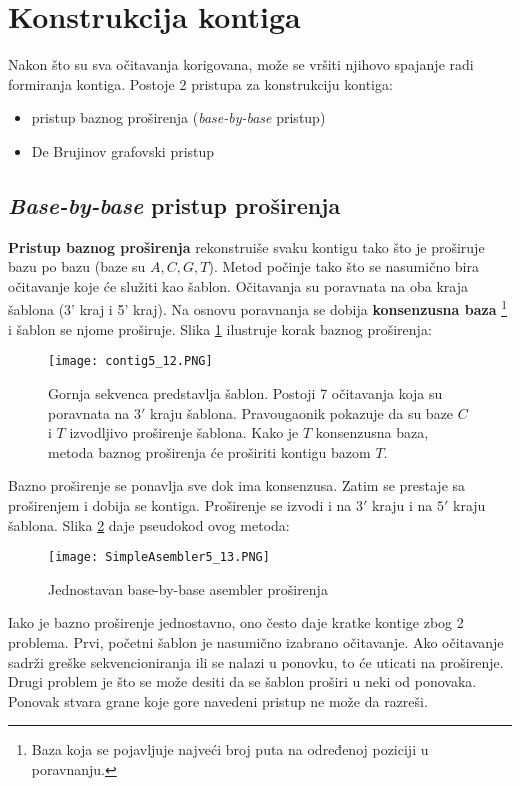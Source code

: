\documentclass[12pt,oneside]{memoir}
\begin{document}
\section{Konstrukcija kontiga}

Nakon što su sva očitavanja korigovana, može se vršiti njihovo spajanje radi formiranja kontiga. Postoje 2 pristupa za konstrukciju kontiga:
\begin{itemize}
    \item{pristup baznog proširenja (\textit{base-by-base} pristup)}
    \item{De Brujinov grafovski pristup}
\end{itemize}

\subsection{\textit{Base-by-base} pristup proširenja}

\textbf{Pristup baznog proširenja} rekonstruiše svaku kontigu tako što je proširuje bazu po bazu (baze su $A, C, G, T$). Metod počinje tako što se nasumično bira očitavanje koje će služiti kao šablon. Očitavanja su poravnata na oba kraja šablona (3' kraj i 5' kraj). Na osnovu poravnanja se dobija \textbf{konsenzusna baza} \footnote{Baza koja se pojavljuje najveći broj puta na određenoj poziciji u poravnanju.} i šablon se njome proširuje. Slika \ref{fig:7} ilustruje  korak baznog proširenja:

\begin{figure}[!ht]
  \centering
  \texttt{[image: contig5\_12.PNG]}
\caption{Gornja sekvenca predstavlja šablon. Postoji 7 očitavanja koja su poravnata na $3'$ kraju šablona. Pravougaonik pokazuje da su baze $C$ i $T$ izvodljivo proširenje šablona. Kako je $T$ konsenzusna baza, metoda baznog proširenja će proširiti kontigu bazom $T$.}
\label{fig:7}
\end{figure}

Bazno proširenje se ponavlja sve dok ima konsenzusa. Zatim se prestaje sa proširenjem i dobija se kontiga. Proširenje se izvodi i na $3'$ kraju i na $5'$ kraju šablona. Slika \ref{fig:8} daje pseudokod ovog metoda:


\begin{figure}[!ht]
\centering
\texttt{[image: SimpleAsembler5\_13.PNG]}
\caption{Jednostavan base-by-base asembler proširenja}
\label{fig:8}
\end{figure}

Iako je bazno proširenje jednostavno, ono često daje kratke kontige zbog 2 problema. Prvi, početni šablon je nasumično izabrano očitavanje. Ako očitavanje sadrži greške sekvencioniranja ili se nalazi u ponovku, to će uticati na proširenje. Drugi problem je što se može desiti da se šablon proširi u neki od ponovaka. Ponovak stvara grane koje gore navedeni pristup ne može da razreši.
\end{document}
